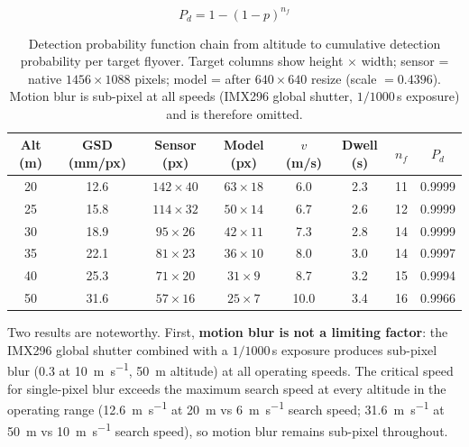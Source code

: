 \begin{equation}\label{eq:pdetect}
  P_d = 1 - (1 - p)^{n_f}
\end{equation}

\begin{table}[ht]
  \centering\compactTable
  \caption{Detection probability function chain from altitude to cumulative detection probability per target flyover. Target columns show height $\times$ width; sensor = native $1456\!\times\!1088$ pixels; model = after $640\!\times\!640$ resize (scale $= 0.4396$). Motion blur is sub-pixel at all speeds (IMX296 global shutter, $1/1000$\,s exposure) and is therefore omitted.}\label{tab:detect-chain}
  \begin{tabularx}{\linewidth}{@{}c c c c c c c c@{}}
    \toprule
    \textbf{Alt (m)} & \textbf{GSD (mm/px)} & \textbf{Sensor (px)} & \textbf{Model (px)} & $v$ \textbf{(m/s)} & \textbf{Dwell (s)} & $n_f$ & $P_d$ \\
    \midrule
    20 & 12.6 & $142 \times 40$ & $63 \times 18$ & 6.0  & 2.3  & 11 & 0.9999 \\
    25 & 15.8 & $114 \times 32$ & $50 \times 14$ & 6.7  & 2.6  & 12 & 0.9999 \\
    30 & 18.9 & $95 \times 26$  & $42 \times 11$ & 7.3  & 2.8  & 14 & 0.9999 \\
    35 & 22.1 & $81 \times 23$  & $36 \times 10$ & 8.0  & 3.0  & 14 & 0.9997 \\
    40 & 25.3 & $71 \times 20$  & $31 \times 9$  & 8.7  & 3.2  & 15 & 0.9994 \\
    50 & 31.6 & $57 \times 16$  & $25 \times 7$  & 10.0 & 3.4  & 16 & 0.9966 \\
    \bottomrule
  \end{tabularx}
\end{table}

Two results are noteworthy.
First, \textbf{motion blur is not a limiting factor}: the IMX296 global shutter combined with a $1/1000$\,s exposure produces sub-pixel blur (\SI{0.3}{\px} at \SI{10}{\metre\per\second}, \SI{50}{\metre} altitude) at all operating speeds.
The critical speed for single-pixel blur exceeds the maximum search speed at every altitude in the operating range (\SI{12.6}{\metre\per\second} at \SI{20}{\metre} vs \SI{6}{\metre\per\second} search speed; \SI{31.6}{\metre\per\second} at \SI{50}{\metre} vs \SI{10}{\metre\per\second} search speed), so motion blur remains sub-pixel throughout.

